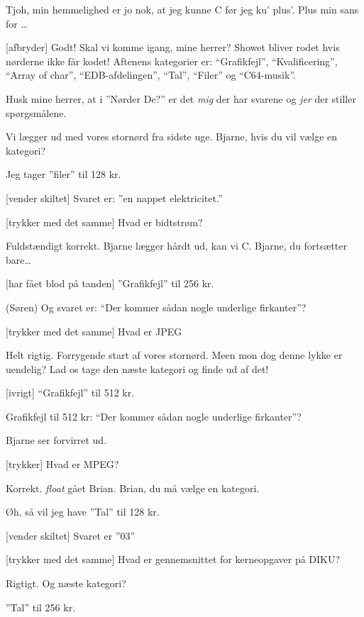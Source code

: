 \documentclass[danish]{article}
\begin{document}
\begin{sketch}
 Tjoh, min hemmelighed er jo nok, at jeg kunne C før jeg ku'
plus'.  Plus min sans for \ldots{} 

[afbryder] Godt!  Skal vi komme igang, mine herrer?  Showet
bliver rodet hvis nørderne ikke får kodet!  Aftenens kategorier er:  
``Grafikfejl'', ``Kvalificering'', ``Array of char'', ``EDB-afdelingen'',
``Tal'', ``Filer'' og ``C64-musik''.

Husk mine herrer, at i ''Nørder De?'' er det \emph{mig} der har svarene og
\emph{jer} der stiller spørgsmålene.

Vi lægger ud med vores stornørd fra sidste uge. Bjarne, hvis du vil vælge en
kategori?

 Jeg tager ''filer'' til 128 kr.

[vender skiltet] Svaret er: ''en nappet elektricitet.''

[trykker med det samme] Hvad er bidtstrøm?

 Fuldstændigt korrekt. Bjarne lægger hårdt ud, kan vi C. Bjarne, du
fortsætter bare\ldots{}

[har fået blod på tanden] ''Grafikfejl'' til 256 kr.

\says(Søren) Og svaret er:  ``Der kommer sådan nogle underlige firkanter''?

[trykker med det samme] Hvad er JPEG

 Helt rigtig.  Forrygende start af vores stornørd.  Meen mon
dog denne lykke er uendelig?  Lad os tage den næste kategori og finde
ud af det!

[ivrigt] ``Grafikfejl'' til 512 kr.

 Grafikfejl til 512 kr: ``Der kommer sådan nogle underlige firkanter''?

\scene Bjarne ser forvirret ud.

[trykker] Hvad er MPEG?

 Korrekt. \emph{float} gået Brian. Brian, du må vælge en kategori.

 Øh, så vil jeg have ''Tal'' til 128 kr.

[vender skiltet] Svaret er ''03''

[trykker med det samme] Hvad er gennemsnittet for
kerneopgaver på DIKU?

 Rigtigt. Og næste kategori?

 ''Tal'' til 256 kr.


\end{sketch}
\end{document}
